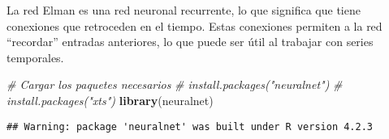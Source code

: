\documentclass[
]{book}
\newenvironment{Shaded}{\begin{snugshade}}{\end{snugshade}}
\newcommand{\CommentTok}[1]{\textcolor[rgb]{0.56,0.35,0.01}{\textit{#1}}}
\newcommand{\FunctionTok}[1]{\textcolor[rgb]{0.13,0.29,0.53}{\textbf{#1}}}
\newcommand{\NormalTok}[1]{#1}
\begin{document}
La red Elman es una red neuronal recurrente, lo que significa que tiene conexiones que retroceden en el tiempo. Estas conexiones permiten a la red ``recordar'' entradas anteriores, lo que puede ser útil al trabajar con series temporales.

\begin{Shaded}
\begin{Highlighting}[]
\CommentTok{\# Cargar los paquetes necesarios}
\CommentTok{\# install.packages("neuralnet")}
\CommentTok{\# install.packages("xts")}
\FunctionTok{library}\NormalTok{(neuralnet)}
\end{Highlighting}
\end{Shaded}

\begin{verbatim}
## Warning: package 'neuralnet' was built under R version 4.2.3
\end{verbatim}
\end{document}
